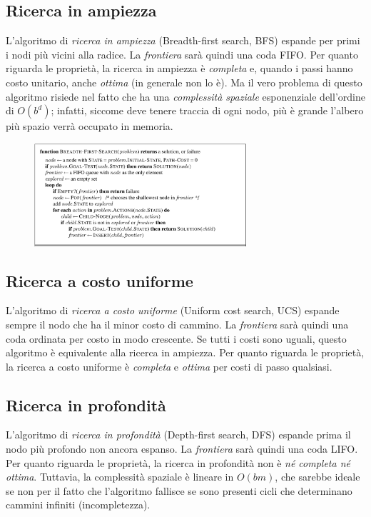 \documentclass[11pt,oneside]{book}
\begin{document}
\subsection{Ricerca in ampiezza}
L'algoritmo di \textit{ricerca in ampiezza} (Breadth-first search, BFS) espande per primi i nodi più vicini alla radice. La \textit{frontiera} sarà quindi una coda FIFO. Per quanto riguarda le proprietà, la ricerca in ampiezza è \textit{completa} e, quando i passi hanno costo unitario, anche \textit{ottima} (in generale non lo è). Ma il vero problema di questo algoritmo risiede nel fatto che ha una \textit{complessità spaziale} esponenziale dell'ordine di $O(b^d)$; infatti, siccome deve tenere traccia di ogni nodo, più è grande l'albero più spazio verrà occupato in memoria.
\begin{figure}[htp]
	\centering
	\includegraphics[width=0.7\textwidth]{bfs.png}
\end{figure}

\subsection{Ricerca a costo uniforme}
L'algoritmo di \textit{ricerca a costo uniforme} (Uniform cost search, UCS) espande sempre il nodo che ha il minor costo di cammino. La \textit{frontiera} sarà quindi una coda ordinata per costo in modo crescente. Se tutti i costi sono uguali, questo algoritmo è equivalente alla ricerca in ampiezza. Per quanto riguarda le proprietà, la ricerca a costo uniforme è \textit{completa} e \textit{ottima} per costi di passo qualsiasi.

\subsection{Ricerca in profondità}
L'algoritmo di \textit{ricerca in profondità} (Depth-first search, DFS) espande prima il nodo più profondo non ancora espanso. La \textit{frontiera} sarà quindi una coda LIFO. Per quanto riguarda le proprietà, la ricerca in profondità non è \textit{né completa né ottima}. Tuttavia, la complessità spaziale è lineare in $O(bm)$, che sarebbe ideale se non per il fatto che l'algoritmo fallisce se sono presenti cicli che determinano cammini infiniti (incompletezza).
\end{document}
